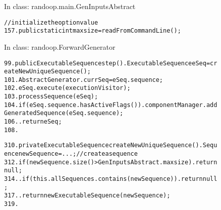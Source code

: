 \begin{figure}[t]
\vspace{-2mm}
\small{In class: randoop.main.GenInputsAbstract}\\
\vspace{-5mm}
\begin{CodeOut}
\begin{alltt}
     //{initialize the option value}
157. public static int maxsize = readFromCommandLine(); 
\end{alltt}
\end{CodeOut}

{\small{In class: randoop.ForwardGenerator}}\\
\vspace{-5mm}
\begin{CodeOut}
\begin{alltt}
99.  public ExecutableSequence step() .   ExecutableSequence eSeq = createNewUniqueSequence();
101.   AbstractGenerator.currSeq = eSeq.sequence;
102.   eSeq.execute(executionVisitor);
103.   processSequence(eSeq);
104.   if (eSeq.sequence.hasActiveFlags()) .     componentManager.addGeneratedSequence(eSeq.sequence);
106.   .   return eSeq;
108. \ttrcb

310. private ExecutableSequence createNewUniqueSequence() .   Sequence newSequence = ...; //create a sequence
312.   if (newSequence.size() > GenInputsAbstract.maxsize) .     return null;
314.   .   if (this.allSequences.contains(newSequence)) .     return null;
317.   .   return new ExecutableSequence(newSequence);
319. \ttrcb
\end{alltt}
\end{CodeOut}
\tinystep
\vspace*{-3.0ex}  %
\end{figure}





